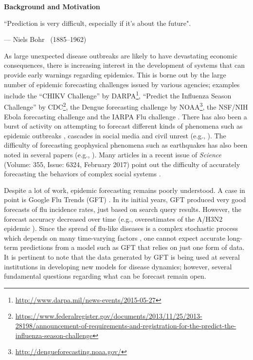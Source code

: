 \noindent
{\Large\textbf{Background and Motivation}}

\epigraph{``Prediction is very difficult, especially if it's about the future".}
{--- \textup{Niels Bohr~ (1885--1962)}}  

\medskip
As large unexpected disease outbreaks are likely to have 
devastating economic consequences, there is increasing interest in
the development of systems that can provide early warnings regarding
epidemics.
This is borne out by the large number of epidemic forecasting challenges 
issued by various agencies; examples include 
the ``CHIKV Challenge'' by 
DARPA\footnote{\url{http://www.darpa.mil/news-events/2015-05-27}},
``Predict the Influenza Season Challenge'' by 
CDC\footnote{\url{https://www.federalregister.gov/documents/2013/11/25/2013-28198/announcement-of-requirements-and-registration-for-the-predict-the-influenza-season-challenge}},
the Dengue forecasting challenge by 
NOAA\footnote{\url{http://dengueforecasting.noaa.gov/}},
the NSF/NIH Ebola forecasting challenge and 
the IARPA Flu challenge \cite{Muthaiah_etal_2016}.
There has also been a burst of activity on attempting to forecast different kinds of
phenomena such as epidemic outbreaks
\cite{nsoesie2013systematic,Nishiura:2011,Ohkusa:2011,Hall:2007,
Vespignani-BMC-2012, chakraborty:sdm14, Scarpino-Petri-2017},
cascades in social media and civil unrest
(e.g., \cite{Martin_etal_2016, Krishnan_etal_2016, Korkmaz_etal_2016,
Ramakrishnan:2014:BNE:2623330.2623373}).
The difficulty of forecasting geophysical phenomena 
such as earthquakes has also been noted in several papers
(e.g., \cite{Geller-1997,Geller-etal-1997}).
Many articles in a recent issue of \emph{Science} 
(Volume: 355, Issue: 6324, February 2017) point out
the difficulty of accurately forecasting the behaviors of
complex social systems \cite{Athey-2017,Bohannon-2017,Cederman-etal-2017,
Clauset-etal-2017,Hofman-etal-2017,Jasny-etal-2017,Kennedy-etal-2017,
Subrahmanian-etal-2017,Tetlock-etal-2017}.

\medskip
Despite a lot of work, epidemic forecasting remains poorly understood.  
A case in point is Google Flu Trends (GFT) 
\cite{ginsberg:nature08:flu-search-engine}. 
In its initial years, GFT
produced very good forecasts of flu incidence rates,
just based on search query results. 
However, the forecast accuracy decreased over time
(e.g., overestimates of the A/H3N2 epidemic
\cite{lazer:science14, olson:ploscb13}).
Since the spread of flu-like diseases is a complex stochastic process 
which depends on many time-varying factors \cite{Drake-2005, Drake-2006},
one cannot expect accurate long-term predictions
from a model such as GFT that relies on just one form of data.
It is pertinent to note that the data generated by GFT is being used at several 
institutions in developing new models for disease dynamics;
however, several fundamental questions regarding 
what can be forecast remain open.

